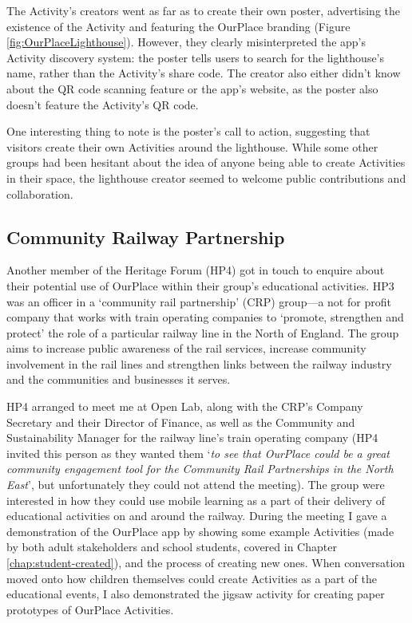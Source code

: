 The Activity's creators went as far as to create their own poster, advertising the existence of the Activity and featuring the OurPlace branding (Figure \ref{fig:OurPlaceLighthouse}). However, they clearly misinterpreted the app's Activity discovery system: the poster tells users to search for the lighthouse's name, rather than the Activity's share code. The creator also either didn't know about the QR code scanning feature or the app's website, as the poster also doesn't feature the Activity's QR code. 

One interesting thing to note is the poster's call to action, suggesting that visitors create their own Activities around the lighthouse. While some other groups had been hesitant about the idea of anyone being able to create Activities in their space, the lighthouse creator seemed to welcome public contributions and collaboration.

\subsection{Community Railway Partnership}
\label{app:crp}

Another member of the Heritage Forum (HP4) got in touch to enquire about their potential use of OurPlace within their group's educational activities. HP3 was an officer in a `community rail partnership' (CRP) group---a not for profit company that works with train operating companies to `promote, strengthen and protect' the role of a particular railway line in the North of England. The group aims to increase public awareness of the rail services, increase community involvement in the rail lines and strengthen links between the railway industry and the communities and businesses it serves.

HP4 arranged to meet me at Open Lab, along with the CRP's Company Secretary and their Director of Finance, as well as the Community and Sustainability Manager for the railway line's train operating company (HP4 invited this person as they wanted them `\textit{to see that OurPlace could be a great community engagement tool for the Community Rail Partnerships in the North East}', but unfortunately they could not attend the meeting). The group were interested in how they could use mobile learning as a part of their delivery of educational activities on and around the railway. During the meeting I gave a demonstration of the OurPlace app by showing some example Activities (made by both adult stakeholders and school students, covered in Chapter \ref{chap:student-created}), and the process of creating new ones. When conversation moved onto how children themselves could create Activities as a part of the educational events, I also demonstrated the jigsaw activity for creating paper prototypes of OurPlace Activities.

